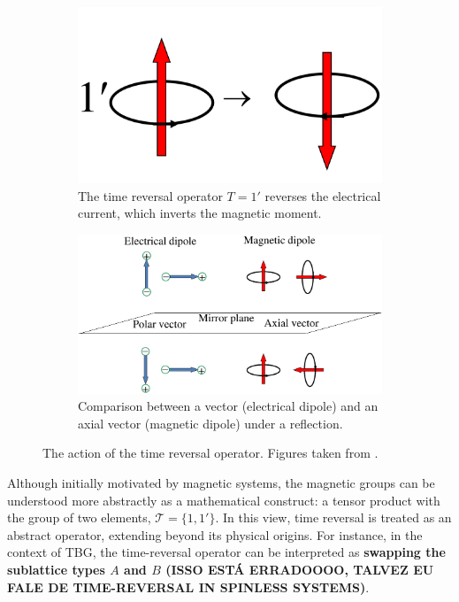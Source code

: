 \begin{figure}[H]
\centering
\begin{subfigure}{.4\textwidth}
  \centering
  \includegraphics[height=0.6\linewidth]{fig/timerev.png}
  \caption{The time reversal operator $T = 1'$ reverses the electrical current, which inverts the magnetic moment.}
  \label{fig:timerev_a}
\end{subfigure} \hfill
\begin{subfigure}{.55\textwidth}
  \centering
  \includegraphics[width=\linewidth]{fig/axialvec.png}
  \caption{Comparison between a vector (electrical dipole) and an axial vector (magnetic dipole) under a reflection.}
  \label{fig:axialvec_b}
\end{subfigure}
\caption{The action of the time reversal operator. Figures taken from \cite{magnetic_structures2012}.}
\label{fig:timerev_axialvec}
\end{figure}

Although initially motivated by magnetic systems, the magnetic groups can be understood more abstractly as a mathematical construct: a tensor product with the group of two elements, \(\mathcal{T} = \{1, 1'\}\). In this view, time reversal is treated as an abstract operator, extending beyond its physical origins. For instance, in the context of TBG, the time-reversal operator can be interpreted as \textbf{swapping the sublattice types \(A\) and \(B\) (ISSO ESTÁ ERRADOOOO, TALVEZ EU FALE DE TIME-REVERSAL IN SPINLESS SYSTEMS)}.


